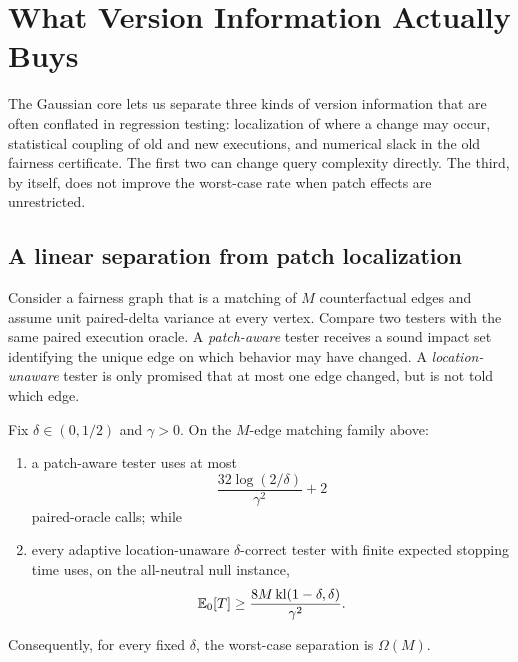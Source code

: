 \section{What Version Information Actually Buys}
\label{arch:sec:consequences}

The Gaussian core lets us separate three kinds of version information that are
often conflated in regression testing: localization of where a change may occur,
statistical coupling of old and new executions, and numerical slack in the old
fairness certificate.  The first two can change query complexity directly.  The
third, by itself, does not improve the worst-case rate when patch effects are
unrestricted.

\subsection{A linear separation from patch localization}

Consider a fairness graph that is a matching of $M$ counterfactual edges and
assume unit paired-delta variance at every vertex.  Compare two testers with the
same paired execution oracle.  A \emph{patch-aware} tester receives a sound
impact set identifying the unique edge on which behavior may have changed.  A
\emph{location-unaware} tester is only promised that at most one edge changed,
but is not told which edge.

\begin{corollary}
\label{arch:cor:locality-separation}
Fix $\delta\in(0,1/2)$ and $\gamma>0$.  On the $M$-edge matching family above:
\begin{enumerate}[label=(\roman*)]
\item a patch-aware tester uses at most
\begin{equation}\label{eq:appendix-07-regression-consequences-001}
\frac{32\log(2/\delta)}{\gamma^2}+2
\end{equation}
paired-oracle calls; while
\item every adaptive location-unaware $\delta$-correct tester with finite expected
stopping time uses, on the all-neutral null instance,
\begin{equation}\label{eq:appendix-07-regression-consequences-002}
\mathbb{E}_0[T]\ge
\frac{8M\,\mathrm{kl}(1-\delta,\delta)}{\gamma^2}.
\end{equation}
\end{enumerate}
Consequently, for every fixed $\delta$, the worst-case separation is
$\Omega(M)$.
\end{corollary}

